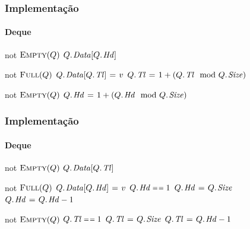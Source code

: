 \documentclass{beamer}
\begin{document}
\begin{frame}

  \frametitle{Implementação}
  \framesubtitle{Deque}

\begin{codebox}
\li  \If not $\textnormal{\scshape Empty}(Q)$
\li    \Then \Return $\attrib{Q}{Data}[\attrib{Q}{Hd}]$
     \End
\end{codebox}
\begin{codebox}
\li  \If not $\textnormal{\scshape Full}(Q)$
\li    \Then $\attrib{Q}{Data}[\attrib{Q}{Tl}] \gets v$
\li      $\attrib{Q}{Tl} \gets 1 + (\attrib{Q}{Tl} \mod \attrib{Q}{Size})$
     \End
\end{codebox}
\begin{codebox}
\li  \If not $\textnormal{\scshape Empty}(Q)$
\li    \Then $\attrib{Q}{Hd} \gets 1 + (\attrib{Q}{Hd} \mod \attrib{Q}{Size})$
     \End
\end{codebox}

\end{frame}

\begin{frame}

  \frametitle{Implementação}
  \framesubtitle{Deque}

\begin{codebox}
\li  \If not $\textnormal{\scshape Empty}(Q)$
\li    \Then \Return $\attrib{Q}{Data}[\attrib{Q}{Tl}]$
     \End
\end{codebox}
\begin{codebox}
\li  \If not $\textnormal{\scshape Full}(Q)$
\li    \Then $\attrib{Q}{Data}[\attrib{Q}{Hd}] \gets v$
\li      \If $\attrib{Q}{Hd} \isequal 1$
\li        \Then $\attrib{Q}{Hd} \gets \attrib{Q}{Size}$
\li        \Else $\attrib{Q}{Hd} \gets \attrib{Q}{Hd} - 1$
         \End
     \End
\end{codebox}
\begin{codebox}
\li  \If not $\textnormal{\scshape Empty}(Q)$
\li    \Then \If $\attrib{Q}{Tl} \isequal 1$
\li      \Then $\attrib{Q}{Tl} \gets \attrib{Q}{Size}$
\li      \Else $\attrib{Q}{Tl} \gets \attrib{Q}{Hd} - 1$
       \End
     \End
\end{codebox}

\end{frame}
\end{document}
